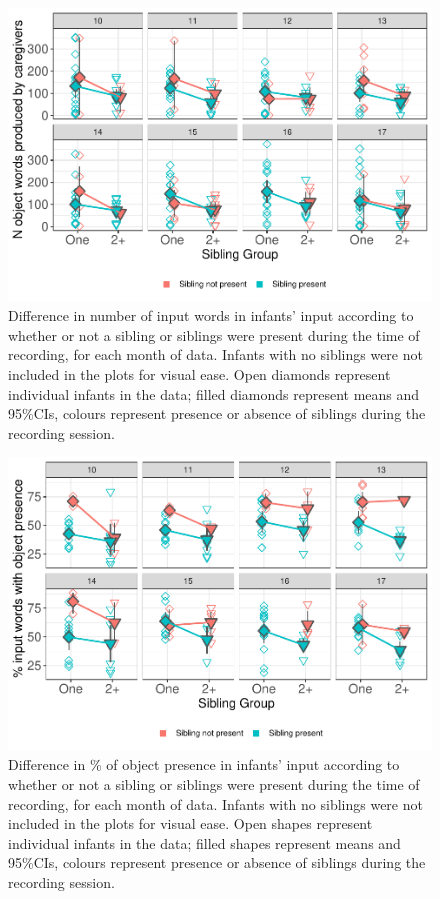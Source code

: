 \documentclass[
  man,mask,floatsintext]{apa6}
\begin{document}
\begin{figure}
\centering
\includegraphics{SiblingsStudyText-anon-revisions_files/figure-latex/figure-sibpresence-input-1.pdf}
\caption{\label{fig:figure-sibpresence-input}Difference in number of input words in infants' input according to whether or not a sibling or siblings were present during the time of recording, for each month of data. Infants with no siblings were not included in the plots for visual ease. Open diamonds represent individual infants in the data; filled diamonds represent means and 95\%CIs, colours represent presence or absence of siblings during the recording session.}
\end{figure}

\begin{figure}
\centering
\includegraphics{SiblingsStudyText-anon-revisions_files/figure-latex/figure-sibpresence-obj-1.pdf}
\caption{\label{fig:figure-sibpresence-obj}Difference in \% of object presence in infants' input according to whether or not a sibling or siblings were present during the time of recording, for each month of data. Infants with no siblings were not included in the plots for visual ease. Open shapes represent individual infants in the data; filled shapes represent means and 95\%CIs, colours represent presence or absence of siblings during the recording session.}
\end{figure}
\end{document}
